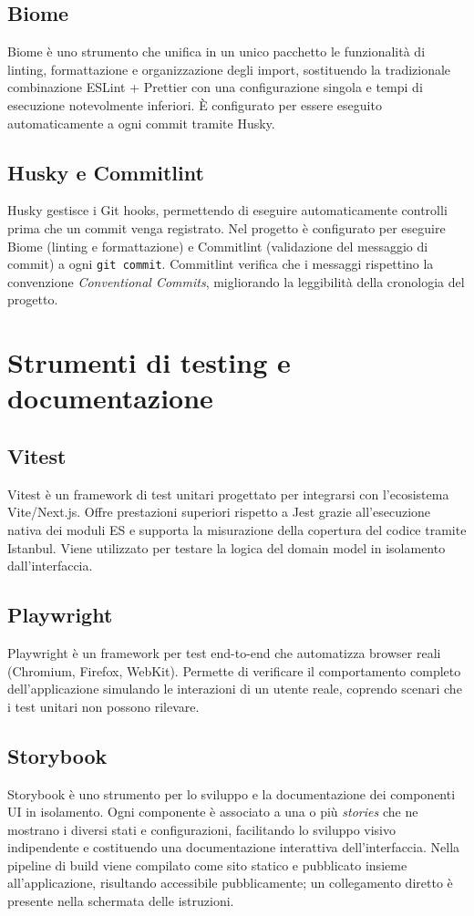 \documentclass[12pt]{report}
\begin{document}
\subsection{Biome}
Biome è uno strumento che unifica in un unico pacchetto le funzionalità di linting, formattazione e organizzazione degli import, sostituendo la tradizionale combinazione ESLint + Prettier con una configurazione singola e tempi di esecuzione notevolmente inferiori.
È configurato per essere eseguito automaticamente a ogni commit tramite Husky.

\subsection{Husky e Commitlint}
Husky gestisce i Git hooks, permettendo di eseguire automaticamente controlli prima che un commit venga registrato.
Nel progetto è configurato per eseguire Biome (linting e formattazione) e Commitlint (validazione del messaggio di commit) a ogni \texttt{git commit}.
Commitlint verifica che i messaggi rispettino la convenzione \textit{Conventional Commits}, migliorando la leggibilità della cronologia del progetto.

\section{Strumenti di testing e documentazione}

\subsection{Vitest}
Vitest è un framework di test unitari progettato per integrarsi con l'ecosistema Vite/Next.js.
Offre prestazioni superiori rispetto a Jest grazie all'esecuzione nativa dei moduli ES e supporta la misurazione della copertura del codice tramite Istanbul.
Viene utilizzato per testare la logica del domain model in isolamento dall'interfaccia.

\subsection{Playwright}
Playwright è un framework per test end-to-end che automatizza browser reali (Chromium, Firefox, WebKit).
Permette di verificare il comportamento completo dell'applicazione simulando le interazioni di un utente reale, coprendo scenari che i test unitari non possono rilevare.

\subsection{Storybook}
Storybook è uno strumento per lo sviluppo e la documentazione dei componenti UI in isolamento.
Ogni componente è associato a una o più \textit{stories} che ne mostrano i diversi stati e configurazioni, facilitando lo sviluppo visivo indipendente e costituendo una documentazione interattiva dell'interfaccia.
Nella pipeline di build viene compilato come sito statico e pubblicato insieme all'applicazione, risultando accessibile pubblicamente; un collegamento diretto è presente nella schermata delle istruzioni.
\end{document}
